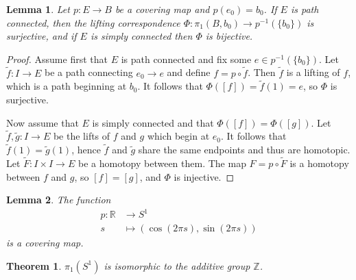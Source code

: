 \documentclass{report}
\newtheorem{theorem}{Theorem}[section]
\newtheorem{lemma}{Lemma}[section]
\theoremstyle{definition}
\theoremstyle{remark}
\newcommand{\Z}{\mathbb{Z}}
\newcommand{\R}{\mathbb{R}}
\newcommand{\set}[1]{\{#1\}}
\let\oldsin\sin
\let\oldcos\cos
\renewcommand{\sin}[1]{\oldsin \left( #1 \right)}
\renewcommand{\cos}[1]{\oldcos \left( #1 \right)}
\begin{document}
\begin{lemma}
    Let $p : E \to B$ be a covering map and $p(e_0) = b_0$. If $E$ is path connected, then the lifting correspondence $\Phi : \pi_1(B, b_0) \to p^{-1}(\set{b_0})$ is surjective, and if $E$ is simply connected then $\Phi$ is bijective.
\end{lemma}

\begin{proof}
    Assume first that $E$ is path connected and fix some $e \in p^{-1}(\set{b_0})$. Let $\tilde{f} : I \to E$ be a path connecting $e_0 \to e$ and define $f = p \circ \tilde{f}$. Then $\tilde{f}$ is a lifting of $f$, which is a path beginning at $b_0$. It follows that $\Phi([f]) = \tilde{f}(1) = e$, so $\Phi$ is surjective.
    
    Now assume that $E$ is simply connected and that $\Phi([f]) = \Phi([g])$. Let $\tilde{f}, \tilde{g} : I \to E$ be the lifts of $f$ and $g$ which begin at $e_0$. It follows that $\tilde{f}(1) = \tilde{g}(1)$, hence $\tilde{f}$ and $\tilde{g}$ share the same endpoints and thus are homotopic. Let $\tilde{F} : I \times I \to E$ be a homotopy between them. The map $F = p \circ \tilde{F}$ is a homotopy between $f$ and $g$, so $[f] = [g]$, and $\Phi$ is injective.
\end{proof}

\begin{lemma}
    The function 
    \begin{align*}
        p : \R &\to S^1 \\
        s &\mapsto (\cos{2 \pi s}, \sin{2 \pi s})
    \end{align*} is a covering map.
\end{lemma}

\begin{theorem}
    $\pi_1(S^1)$ is isomorphic to the additive group $\Z$.
\end{theorem}
\end{document}
